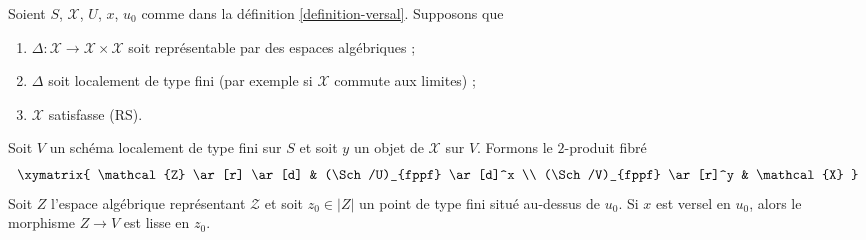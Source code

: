 \begin{lemma}
\label{lemma-base-change-versal}
Soient $S$, $\mathcal{X}$, $U$, $x$, $u_0$ comme dans la définition
\ref{definition-versal}. Supposons que
\begin{enumerate}
\item $\Delta : \mathcal{X} \to \mathcal{X} \times \mathcal{X}$
soit représentable par des espaces algébriques ;
\item $\Delta$ soit localement de type fini (par exemple si $\mathcal{X}$
commute aux limites) ;
\item $\mathcal{X}$ satisfasse (RS).
\end{enumerate}
Soit $V$ un schéma localement de type fini sur $S$ et soit $y$ un objet de
$\mathcal{X}$ sur $V$. Formons le $2$-produit fibré
$$
\xymatrix{
\mathcal{Z} \ar[r] \ar[d] & (\Sch/U)_{fppf} \ar[d]^x \\
(\Sch/V)_{fppf} \ar[r]^y & \mathcal{X}
}
$$
Soit $Z$ l'espace algébrique représentant $\mathcal{Z}$ et soit
$z_0 \in |Z|$ un point de type fini situé au-dessus de $u_0$. Si $x$ est
versel en $u_0$, alors le morphisme $Z \to V$ est lisse en $z_0$.
\end{lemma}

